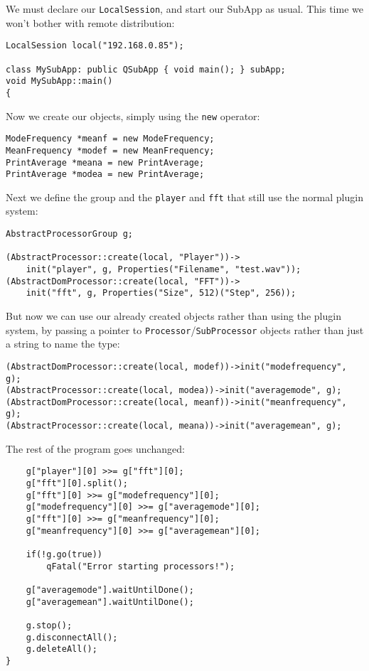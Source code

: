 We must declare our \texttt{LocalSession}, and start our SubApp as usual. This time we won't bother with remote distribution:

\begin{verbatim}
LocalSession local("192.168.0.85");

class MySubApp: public QSubApp { void main(); } subApp;
void MySubApp::main()
{
\end{verbatim}

Now we create our objects, simply using the \texttt{new} operator:

\begin{verbatim}
ModeFrequency *meanf = new ModeFrequency;
MeanFrequency *modef = new MeanFrequency;
PrintAverage *meana = new PrintAverage;
PrintAverage *modea = new PrintAverage;
\end{verbatim}

Next we define the group and the \texttt{player} and \texttt{fft} that still use the normal plugin system:

\begin{verbatim}
AbstractProcessorGroup g;

(AbstractProcessor::create(local, "Player"))->
    init("player", g, Properties("Filename", "test.wav"));
(AbstractDomProcessor::create(local, "FFT"))->
    init("fft", g, Properties("Size", 512)("Step", 256));
\end{verbatim}

But now we can use our already created objects rather than using the plugin system, by passing a pointer to \texttt{Processor}/\texttt{SubProcessor} objects rather than just a string to name the type:

\begin{verbatim}
(AbstractDomProcessor::create(local, modef))->init("modefrequency", g);
(AbstractProcessor::create(local, modea))->init("averagemode", g);
(AbstractDomProcessor::create(local, meanf))->init("meanfrequency", g);
(AbstractProcessor::create(local, meana))->init("averagemean", g);
\end{verbatim}

The rest of the program goes unchanged:

\begin{verbatim}
    g["player"][0] >>= g["fft"][0];
    g["fft"][0].split();
    g["fft"][0] >>= g["modefrequency"][0];
    g["modefrequency"][0] >>= g["averagemode"][0];
    g["fft"][0] >>= g["meanfrequency"][0];
    g["meanfrequency"][0] >>= g["averagemean"][0];
    
    if(!g.go(true))
        qFatal("Error starting processors!");
    
    g["averagemode"].waitUntilDone();
    g["averagemean"].waitUntilDone();
    
    g.stop();
    g.disconnectAll();
    g.deleteAll();
}
\end{verbatim}

